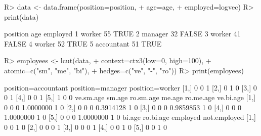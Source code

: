 \documentclass{article}\usepackage[]{graphicx}\usepackage[]{color}
\begin{document}
\begin{Schunk}
% --begin: "lcut.data.frame"
\begin{Sinput}
R> data <- data.frame(position=position,
+                     age=age,
+                     employed=logvec)
R> print(data)
\end{Sinput}
\begin{Soutput}
    position age employed
1     worker  55     TRUE
2    manager  32    FALSE
3     worker  41    FALSE
4     worker  52     TRUE
5 accountant  51     TRUE
\end{Soutput}
\begin{Sinput}
R> employees <- lcut(data,
+       context=ctx3(low=0, high=100),
+       atomic=c("sm", "me", "bi"),
+       hedges=c("ve", "-", "ro"))
R> print(employees)
\end{Sinput}
\begin{Soutput}
     position=accountant position=manager position=worker
[1,]                   0                0               1
[2,]                   0                1               0
[3,]                   0                0               1
[4,]                   0                0               1
[5,]                   1                0               0
     ve.sm.age sm.age ro.sm.age    me.age ro.me.age ve.bi.age
[1,]         0      0         0 1.0000000         1         0
[2,]         0      0         0 0.3914128         1         0
[3,]         0      0         0 0.9859853         1         0
[4,]         0      0         0 1.0000000         1         0
[5,]         0      0         0 1.0000000         1         0
     bi.age ro.bi.age employed not.employed
[1,]      0         0        1            0
[2,]      0         0        0            1
[3,]      0         0        0            1
[4,]      0         0        1            0
[5,]      0         0        1            0
\end{Soutput}
%
% --end: "lcut.data.frame"
\end{Schunk}
\end{document}
